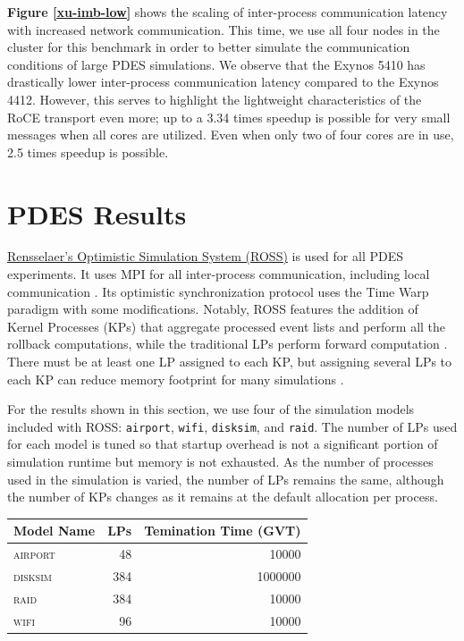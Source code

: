 \documentclass[11pt]{book}
\begin{document}
\textbf{Figure \ref{xu-imb-low}} shows the scaling of inter-process
communication latency with increased network communication. This time, we use
all four nodes in the cluster for this benchmark in order to better simulate the
communication conditions of large PDES simulations. We observe that the Exynos
5410 has drastically lower inter-process communication latency compared to the
Exynos 4412. However, this serves to highlight the lightweight characteristics
of the RoCE transport even more; up to a 3.34 times speedup is possible for very
small messages when all cores are utilized. Even when only two of four cores are
in use, 2.5 times speedup is possible.

\section{\textbf{PDES Results}}

\href{https://github.com/carothersc/ROSS}{Rensselaer's Optimistic Simulation
  System (ROSS)} is used for all PDES experiments. It uses MPI for all
inter-process communication, including local communication
\cite{carothers-02}. Its optimistic synchronization protocol uses the Time Warp
paradigm with some modifications. Notably, ROSS features the addition of Kernel
Processes (KPs) that aggregate processed event lists and perform all the
rollback computations, while the traditional LPs perform forward computation
\cite{carothers-02}. There must be at least one LP assigned to each KP, but
assigning several LPs to each KP can reduce memory footprint for many
simulations \cite{carothers-02}.

For the results shown in this section, we use four of the simulation models
included with ROSS: \verb;airport;, \verb;wifi;, \verb;disksim;, and
\verb;raid;. The number of LPs used for each model is tuned so that startup
overhead is not a significant portion of simulation runtime but memory is not
exhausted. As the number of processes used in the simulation is varied, the
number of LPs remains the same, although the number of KPs changes as it remains
at the default allocation per process. %

\begin{tabular}[c]{| l | r | r |}
  \hline
  Model Name & LPs & Temination Time (GVT) \\ \hline
  \textsc{airport} & 48 & 10000 \\
  \textsc{disksim} & 384 & 1000000 \\
  \textsc{raid} & 384 & 10000 \\
  \textsc{wifi} & 96 & 10000 \\
  \hline
\end{tabular}
\end{document}
